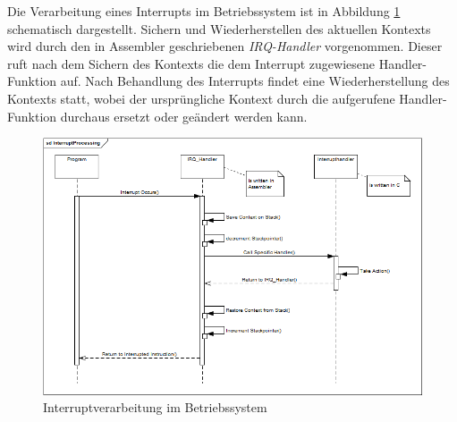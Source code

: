 Die Verarbeitung eines Interrupts im Betriebssystem ist in Abbildung \ref{fig:interruptProcessing} schematisch dargestellt. Sichern und Wiederherstellen des aktuellen Kontexts wird durch den in Assembler geschriebenen \textit{IRQ-Handler} vorgenommen. Dieser ruft nach dem Sichern des Kontexts die dem Interrupt zugewiesene Handler-Funktion auf. Nach Behandlung des Interrupts findet eine Wiederherstellung des Kontexts statt, wobei der ursprüngliche Kontext durch die aufgerufene Handler-Funktion durchaus ersetzt oder geändert werden kann.

\begin{figure}[H]
	\includegraphics[scale=0.55]{chapters/hal/figures/InterruptProcessing}
	\caption{Interruptverarbeitung im Betriebssystem}
	\label{fig:interruptProcessing}
\end{figure}
\pagebreak 
